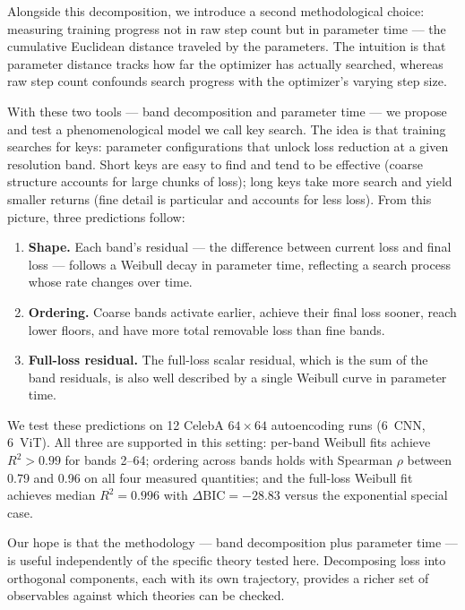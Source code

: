 \documentclass{article}
\begin{document}
Alongside this decomposition, we introduce a second methodological
choice: measuring training progress not in raw step count but in
parameter time --- the cumulative Euclidean distance traveled by the
parameters. The intuition is that parameter distance tracks how far the
optimizer has actually searched, whereas raw step count confounds search
progress with the optimizer's varying step size.

With these two tools --- band decomposition and parameter time --- we
propose and test a phenomenological model we call key search. The idea
is that training searches for keys: parameter
configurations that unlock loss reduction at a given resolution band.
Short keys are easy to find and tend to be effective (coarse structure
accounts for large chunks of loss); long keys take more search and yield
smaller returns (fine detail is particular and accounts for less loss).
From this picture, three predictions follow:

\begin{enumerate}
\item \textbf{Shape.} Each band's residual --- the difference between current
  loss and final loss --- follows a Weibull decay in parameter
  time, reflecting a search process whose rate changes over time.
\item \textbf{Ordering.} Coarse bands activate earlier, achieve their final loss sooner,
  reach lower floors, and have more total removable loss than fine bands.
\item \textbf{Full-loss residual.} The full-loss scalar residual, which
  is the sum of the band residuals, is also well described by a single
  Weibull curve in parameter time.
\end{enumerate}

We test these predictions on 12 CelebA $64\times 64$ autoencoding runs
(6~CNN, 6~ViT). All three are supported in this setting: per-band Weibull fits achieve
$R^2 > 0.99$ for bands 2--64; ordering across bands holds with Spearman
$\rho$ between 0.79 and 0.96 on all four measured quantities; and the
full-loss Weibull fit achieves median $R^2 = 0.996$ with
$\Delta\mathrm{BIC} = -28.83$ versus the exponential special case.

Our hope is that the methodology --- band decomposition plus parameter
time --- is useful independently of the specific theory tested here.
Decomposing loss into orthogonal components, each with
its own trajectory, provides a richer set of observables against which
theories can be checked.
\end{document}
